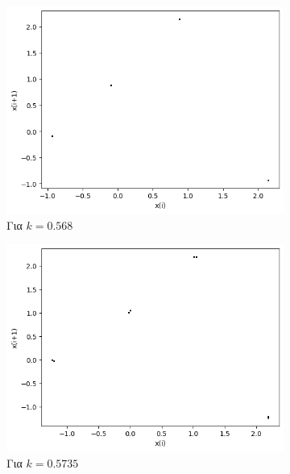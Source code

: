 \begin{figure}[ht]
\begin{subfigure}[c]{0.4\textwidth}
		\includegraphics[width=\textwidth]{LateX images/graphs/k0568}
		\caption{Για $k=0.568$}
		\label{f:k12}
	\end{subfigure}
	\hfill
	\begin{subfigure}[c]{0.4\textwidth}
		\centering
		\includegraphics[width=\textwidth]{LateX images/graphs/k05735}
		\caption{Για $k=0.5735$}
		\label{f:k13}
	\end{subfigure}
	\hfill
	\begin{subfigure}[c]{0.4\textwidth}
		\centering

\end{subfigure}
\end{figure}
